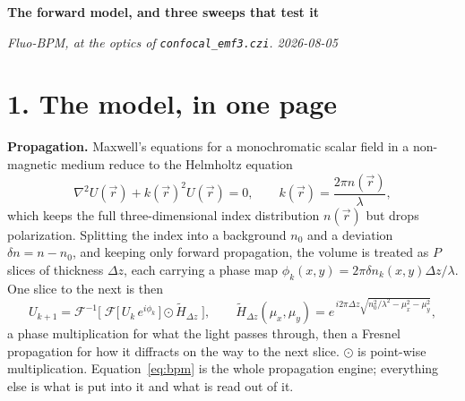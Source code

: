 \documentclass[11pt,a4paper]{article}
\newcommand{\FT}{\mathcal{F}}
\begin{document}
\textbf{\large The forward model, and three sweeps that test it}

\textit{Fluo-BPM, at the optics of \texttt{confocal\_emf3.czi}. 2026-08-05}

\section*{1. The model, in one page}

\textbf{Propagation.} Maxwell's equations for a monochromatic scalar field in a
non-magnetic medium reduce to the Helmholtz equation
\begin{equation}
\nabla^2 U(\vec r) + k(\vec r)^2 U(\vec r) = 0,
\qquad k(\vec r) = \frac{2\pi n(\vec r)}{\lambda},
\end{equation}
which keeps the full three-dimensional index distribution $n(\vec r)$ but drops
polarization. Splitting the index into a background $n_0$ and a deviation
$\delta n = n - n_0$, and keeping only forward propagation, the volume is treated as
$P$ slices of thickness $\Delta z$, each carrying a phase map
$\phi_k(x,y) = 2\pi \delta n_k(x,y) \Delta z / \lambda$. One slice to the next is then
\begin{equation}
U_{k+1} = \FT^{-1}\!\Big[\;\FT\big[\,U_k \, e^{i\phi_k}\,\big] \odot \tilde H_{\Delta z}\;\Big],
\qquad
\tilde H_{\Delta z}(\mu_x,\mu_y) = e^{\,i 2\pi \Delta z \sqrt{n_0^2/\lambda^2 - \mu_x^2 - \mu_y^2}} ,
\label{eq:bpm}
\end{equation}
a phase multiplication for what the light passes through, then a Fresnel propagation
for how it diffracts on the way to the next slice. $\odot$ is point-wise
multiplication. Equation~\eqref{eq:bpm} is the whole propagation engine; everything
else is what is put into it and what is read out of it.
\end{document}
